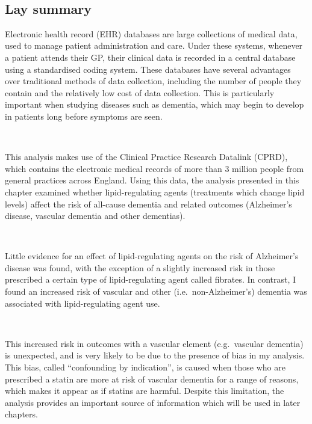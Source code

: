 \documentclass[a4paper, twoside]{templates/ociamthesis}
\begin{document}
~

\minitoc 

\begin{laybox}

\hypertarget{lay-summary-4}{%
\section*{Lay summary}\label{lay-summary-4}}

Electronic health record (EHR) databases are large collections of medical data, used to manage patient administration and care. Under these systems, whenever a patient attends their GP, their clinical data is recorded in a central database using a standardised coding system. These databases have several advantages over traditional methods of data collection, including the number of people they contain and the relatively low cost of data collection. This is particularly important when studying diseases such as dementia, which may begin to develop in patients long before symptoms are seen.

~

This analysis makes use of the Clinical Practice Research Datalink (CPRD), which contains the electronic medical records of more than 3 million people from general practices across England. Using this data, the analysis presented in this chapter examined whether lipid-regulating agents (treatments which change lipid levels) affect the risk of all-cause dementia and related outcomes (Alzheimer's disease, vascular dementia and other dementias).

~

Little evidence for an effect of lipid-regulating agents on the risk of Alzheimer's disease was found, with the exception of a slightly increased risk in those prescribed a certain type of lipid-regulating agent called fibrates. In contrast, I found an increased risk of vascular and other (i.e.~non-Alzheimer's) dementia was associated with lipid-regulating agent use.

~

This increased risk in outcomes with a vascular element (e.g.~vascular dementia) is unexpected, and is very likely to be due to the presence of bias in my analysis. This bias, called ``confounding by indication'', is caused when those who are prescribed a statin are more at risk of vascular dementia for a range of reasons, which makes it appear as if statins are harmful. Despite this limitation, the analysis provides an important source of information which will be used in later chapters.

\end{laybox}
\end{document}
